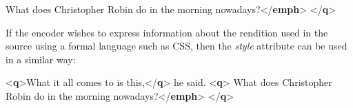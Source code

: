 \begin{shaded}
What does Christopher Robin do in the morning\mbox{}\newline 
\hspace*{1em}\hspace*{1em} nowadays?{</\textbf{emph}>}\mbox{}\newline 
{</\textbf{q}>}\end{shaded}\egroup\par \noindent  If the encoder wishes to express information about the rendition used in the source using a formal language such as CSS, then the {\itshape style} attribute can be used in a similar way: \par\bgroup{}\exampleFont \begin{shaded}\noindent\mbox{}{<\textbf{q}>}What it all comes to is this,{</\textbf{q}>} he said.\mbox{}\newline 
\mbox{}\newline 
{<\textbf{q}>}\mbox{}\newline 
{}What does Christopher Robin do in\mbox{}\newline 
\hspace*{1em}\hspace*{1em} the morning nowadays?{</\textbf{emph}>}\mbox{}\newline 
{</\textbf{q}>}\end{shaded}\egroup\par \par
